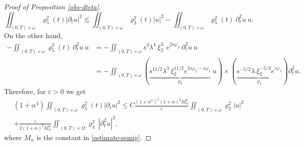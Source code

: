 \documentclass[a4paper, 12pt]{article}
\theoremstyle{plain}
\theoremstyle{definition}
\numberwithin{theorem}{section}
\numberwithin{equation}{section}
\begin{document}
{\begin{proof}[Proof of Proposition \ref{obs-dteta}]
 $$
  \iint_{(0,T)\times\omega}\varrho^2_5(t)|\partial_tu|^2\lesssim \iint_{(0,T)\times\omega}\varrho^2_2(t) |u|^2-\iint_{(0,T)\times\omega}\varrho^2_5(t)~\partial^2_tu~u.
$$
 On the other hand, 
 \begin{align*}
-\iint_{(0,T)\times\omega}\varrho^2_5(t)~\partial^2_tu~u&=-\iint_{(0,T)\times\omega}s^3\lambda^4~ \xi^3_2~~e^{2s\varphi_2}~\partial^2_tu~u\\
&=-\iint_{(0,T)\times\omega}(\underbrace{s^{11/2}\lambda^{3}~\xi^{11/2}_2e^{2s\varphi_2-s\varphi_1}}_{\varrho_2}~u)\times(\underbrace{s^{-5/2}\lambda~\xi_2^{-5/2}e^{s\varphi_1}}_{\varrho_4})\partial^2_tu.
 \end{align*}
 Therefore, for $\varepsilon>0$ we get
 \begin{multline}\label{IPP dtu}
(1+\alpha^4) \iint_{(0,T)\times\omega}\varrho^2_5(t)|\partial_tu|^2\leq C\frac{(1+\alpha^4)^2(1+\alpha)^2M_\alpha^4}{\varepsilon} \iint_{(0,T)\times\omega}\varrho_2^2|u|^2\\ +\frac{\varepsilon}{2(1+\alpha)^2M_\alpha^4}\iint_{(0,T)\times\Omega}\varrho_4^2~|\partial_t^2u|^2,
 \end{multline}
 where $M_\alpha$ is the constant in \eqref{estimate-semig}.


\end{proof}}
\end{document}
